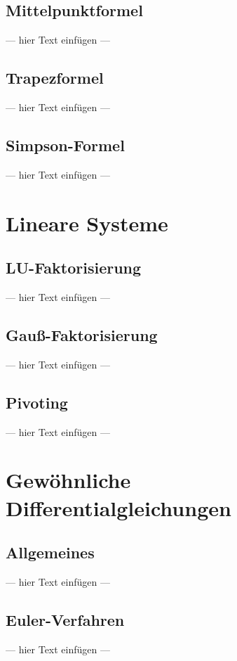 \documentclass[a4paper, 12pt]{article}
\begin{document}
\subsection{Mittelpunktformel}
--- hier Text einfügen ---


\subsection{Trapezformel}
--- hier Text einfügen ---


\subsection{Simpson-Formel}
--- hier Text einfügen ---



\section{Lineare Systeme}


\subsection{LU-Faktorisierung}
--- hier Text einfügen ---


\subsection{Gauß-Faktorisierung}
--- hier Text einfügen ---


\subsection{Pivoting}
--- hier Text einfügen ---



\section{Gewöhnliche Differentialgleichungen}


\subsection{Allgemeines}
--- hier Text einfügen ---


\subsection{Euler-Verfahren}
--- hier Text einfügen ---
\end{document}
